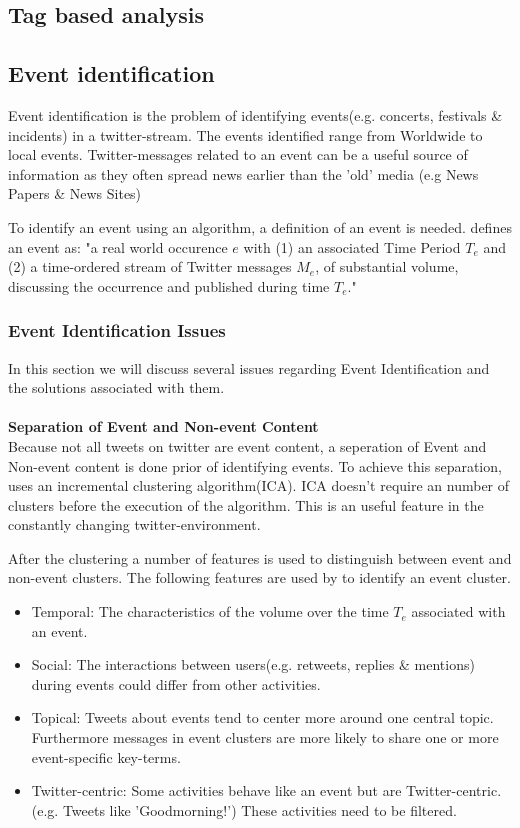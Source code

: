 \documentclass{article}
\begin{document}
\subsection{Tag based analysis}
\subsection{Event identification}

Event identification is the problem of identifying events(e.g. concerts, festivals \& incidents) in a twitter-stream. The events identified range from Worldwide to local events. Twitter-messages related to an event can be a useful source of information as they often spread news earlier than the 'old' media (e.g News Papers \& News Sites)

To identify an event using an algorithm, a definition of an event is needed. \cite{eventident} defines an event as: "a real world occurence $e$ with (1) an associated Time Period $T_e$ and (2) a time-ordered stream of Twitter messages $M_e$, of substantial volume, discussing the
occurrence and published during time $T_e$."

\subsubsection{Event Identification Issues}
In this section we will discuss several issues regarding Event Identification and the solutions associated with them.
\\\\ 
\textbf{Separation of Event and Non-event Content}\\
Because not all tweets on twitter are event content, a seperation of Event and Non-event content is done prior of identifying events. To achieve this separation, \cite{eventident} uses an incremental clustering algorithm(ICA). ICA doesn't require an number of clusters before the execution of the algorithm. This is an useful feature in the constantly changing twitter-environment.

After the clustering a number of features is used to distinguish between event and non-event clusters. The following features are used by \cite{eventident} to identify an event cluster. 
\begin{itemize}
  \item Temporal: The characteristics of the volume over the time $T_e$ associated with an event. 
  \item Social: The interactions between users(e.g. retweets, replies \& mentions) during events could differ from other activities. 
  \item Topical: Tweets about events tend to center more around one central topic. Furthermore messages in event clusters are more likely to share one or more event-specific key-terms.  
  \item Twitter-centric: Some activities behave like an event but are Twitter-centric.(e.g. Tweets like 'Goodmorning!') These activities need to be filtered. 
\end{itemize}
\end{document}
